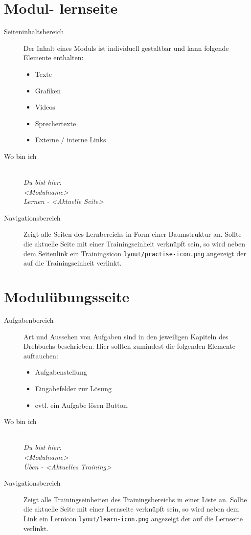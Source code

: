 %
%
%
\section{Modul- lernseite}
\label{sec:hauptseite}

\begin{description}
  \item[Seiteninhaltsbereich] Der Inhalt eines Moduls ist individuell gestaltbar und kann folgende Elemente enthalten:
  \begin{itemize}
    \item Texte
    \item Grafiken
    \item Videos
    \item Sprechertexte
    \item Externe / interne Links
  \end{itemize}
  
  \item[Wo bin ich] \emph{\\Du bist hier:\\<Modulname>\\Lernen - <Aktuelle Seite>}
  \item[Navigationsbereich] Zeigt alle Seiten des Lernbereichs in Form einer Baumstruktur an. Sollte die aktuelle Seite mit einer Trainingseinheit verknüpft sein, so wird neben dem Seitenlink ein Trainingsicon \texttt{lyout/practise-icon.png} angezeigt der auf die Trainingseinheit verlinkt.
  
\end{description}


%
%
%
\section{Modulübungsseite}
\label{sec:module-training-page}

\begin{description}
  \item[Aufgabenbereich] Art und Aussehen von Aufgaben sind in den jeweiligen Kapiteln des Drehbuchs beschrieben. Hier sollten zumindest die folgenden Elemente auftauchen:
  \begin{itemize}
    \item Aufgabenstellung
    \item Eingabefelder zur Lösung
    \item evtl. ein Aufgabe lösen Button.
  \end{itemize}
  \item[Wo bin ich] \emph{\\Du bist hier:\\<Modulname>\\Üben - <Aktuelles Training>}
  \item[Navigationsbereich] Zeigt alle Trainingseinheiten des Trainingsbereichs in einer Liste an. Sollte die aktuelle Seite mit einer Lernseite verknüpft sein, so wird neben dem Link ein Lernicon \texttt{lyout/learn-icon.png} angezeigt 
  der auf die Lernseite verlinkt.
\end{description}



\endinput 
